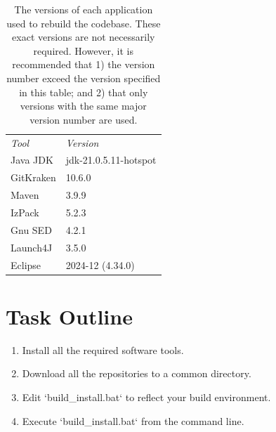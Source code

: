 \documentclass{article}
\begin{document}
\begin{table}[h]
    \centering
    \begin{tabular}{ll}
         \emph{Tool} & \emph{Version} \\
         Java JDK & jdk-21.0.5.11-hotspot \\
         GitKraken & 10.6.0 \\
         Maven & 3.9.9 \\
         IzPack & 5.2.3 \\
         Gnu SED & 4.2.1 \\
         Launch4J & 3.5.0 \\         
         Eclipse &  2024-12 (4.34.0) \\
    \end{tabular}
    \caption{The versions of each application used to rebuild the codebase.  These exact versions are not necessarily required.  However, it is recommended that 1) the version number exceed the version specified in this table; and 2) that only versions with the same major version number are used.}
    \label{tab:versions}
\end{table}

\section{Task Outline}
\begin{enumerate}
    \item Install all the required software tools.
    \item Download all the repositories to a common directory.
    \item Edit `build\_install.bat` to reflect your build environment.
    \item Execute `build\_install.bat` from the command line.
\end{enumerate}
\end{document}
